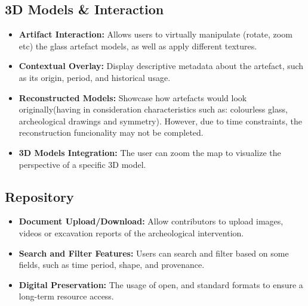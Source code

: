 \subsection*{\gls{3D} Models \& Interaction}
\begin{itemize}
    \item \textbf{Artifact Interaction:} Allows users to virtually manipulate (rotate, zoom etc) the glass artefact models, as well as apply different textures.
    \item \textbf{Contextual Overlay:} Display descriptive metadata about the artefact, such as its origin, period, and historical usage.
    \item \textbf{Reconstructed Models:} Showcase how artefacts would look originally(having in consideration characteristics such as: colourless glass, archeological drawings and symmetry). However, due to time constraints, the reconstruction funcionality may not be completed.
    \item \textbf{3D Models Integration:} The user can zoom the map to visualize the perspective of a specific \gls{3D} model.
\end{itemize}

\subsection*{Repository}
\begin{itemize}
    \item \textbf{Document Upload/Download:} Allow contributors to upload images, videos or excavation reports of the archeological intervention.
    \item \textbf{Search and Filter Features:} Users can search and filter based on some fields, such as time period, shape, and provenance.
    \item \textbf{Digital Preservation:} The usage of open, and standard formats to ensure a long-term resource access.
\end{itemize}


